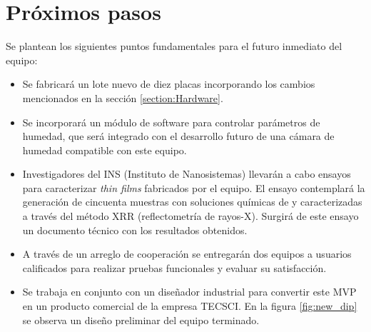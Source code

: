 \section{Próximos pasos}

Se plantean los siguientes puntos fundamentales para el futuro inmediato del equipo:  

\begin{itemize}

\item Se fabricará un lote nuevo de diez placas incorporando los cambios mencionados en la sección \ref{section:Hardware}. 

\item Se incorporará un módulo de software para controlar parámetros de humedad, que será integrado con el desarrollo futuro de una cámara de humedad compatible con este equipo.

\item Investigadores del INS (Instituto de Nanosistemas) llevarán a cabo ensayos para caracterizar \textit{thin films} fabricados por el equipo. El ensayo contemplará la generación de cincuenta muestras con soluciones químicas de  y  caracterizadas a través del método XRR (reflectometría de rayos-X). Surgirá de este ensayo un documento técnico con los resultados obtenidos.  
 
\item A través de un arreglo de cooperación se entregarán dos equipos a usuarios calificados para realizar pruebas funcionales y evaluar su satisfacción.


\item Se trabaja en conjunto con un diseñador industrial para convertir este MVP en un producto comercial de la empresa TECSCI. En la figura \ref{fig:new_dip} se observa un diseño preliminar del equipo terminado.



\end{itemize}
